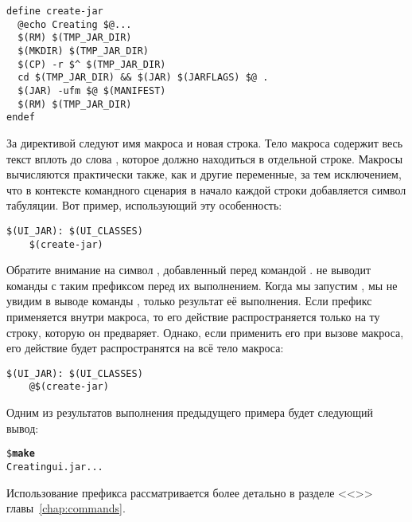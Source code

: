 {\footnotesize
\begin{verbatim}
define create-jar
  @echo Creating $@...
  $(RM) $(TMP_JAR_DIR)
  $(MKDIR) $(TMP_JAR_DIR)
  $(CP) -r $^ $(TMP_JAR_DIR)
  cd $(TMP_JAR_DIR) && $(JAR) $(JARFLAGS) $@ .
  $(JAR) -ufm $@ $(MANIFEST)
  $(RM) $(TMP_JAR_DIR)
endef
\end{verbatim}
}

За директивой  следуют имя макроса и новая строка.
Тело макроса содержит весь текст вплоть до слова ,
которое должно находиться в отдельной строке. Макросы вычисляются
практически также, как и другие переменные, за тем исключением, что в
контексте командного сценария в начало каждой строки добавляется
символ табуляции. Вот пример, использующий эту особенность:

{\footnotesize
\begin{verbatim}
$(UI_JAR): $(UI_CLASSES)
    $(create-jar)
\end{verbatim}
}

Обратите внимание на символ , добавленный перед командой
. \GNUmake{} не выводит команды с таким префиксом перед
их выполнением. Когда мы запустим \GNUmake{}, мы не увидим в выводе
команды , только результат её выполнения. Если префикс
 применяется внутри макроса, то его действие
распространяется только на ту строку, которую он предваряет. Однако,
если применить его при вызове макроса, его действие будет
распространятся на всё тело макроса:

{\footnotesize
\begin{verbatim}
$(UI_JAR): $(UI_CLASSES)
    @$(create-jar)
\end{verbatim}
}

Одним из результатов выполнения предыдущего примера будет следующий
вывод:

{\footnotesize
\begin{alltt}
\$ \textbf{make}
Creating ui.jar...
\end{alltt}
}

Использование префикса  рассматривается более детально в
разделе <<>> главы~\ref{chap:commands}.
